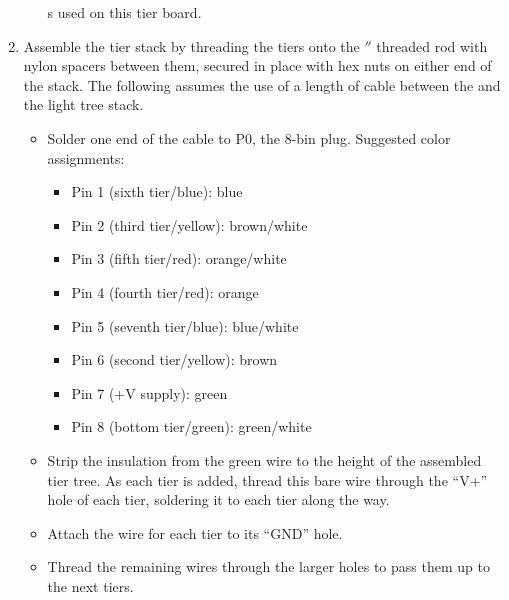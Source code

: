 \begin{enumerate}
\begin{itemize}
				s used on this tier board.
		\end{itemize}
	\item Assemble the tier stack by threading the tiers onto the $''$ threaded rod with nylon spacers between them,
		secured in place with hex nuts on either end of the stack. The following assumes the use of a length of 
		cable between the  and the light tree stack.
		\begin{itemize}
			\item Solder one end of the cable to P0, the 8-bin  plug. Suggested color assignments:
				\begin{itemize}
					\item Pin 1 (sixth tier/blue): blue	
					\item Pin 2 (third tier/yellow): brown/white
					\item Pin 3 (fifth tier/red): orange/white
					\item Pin 4 (fourth tier/red): orange
					\item Pin 5 (seventh tier/blue): blue/white
					\item Pin 6 (second tier/yellow): brown
					\item Pin 7 (+V supply): green
					\item Pin 8 (bottom tier/green): green/white
				\end{itemize}
			\item Strip the insulation from the green wire to the height of the assembled tier tree.
				As each tier is added, thread this bare wire through the ``V+'' hole of each tier, soldering it to
				each tier along the way.
			\item Attach the wire for each tier to its ``GND'' hole.
			\item Thread the remaining wires through the larger holes to pass them up to the next tiers.
		\end{itemize}
\end{enumerate}


                                                      
%
